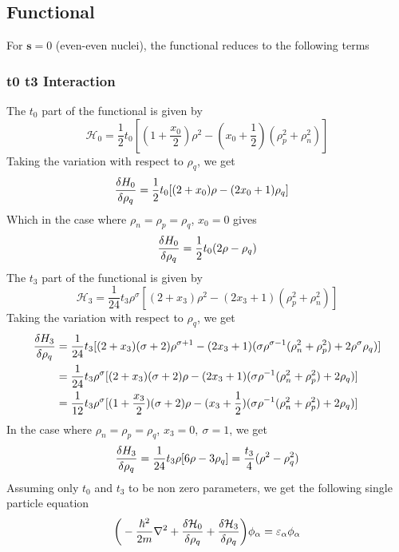 \subsection{Functional}
For $\boldsymbol{s} = 0$ (even-even nuclei), the functional reduces to the following terms
\subsubsection{t0 t3 Interaction}
The $t_0$ part of the functional is given by
\[\mathcal H_0 = \frac 1 2 t_0 [(1+\frac {x_0} 2)\rho^2 - (x_0 + \frac 1 2 )(\rho_p^2 + \rho_n^2)]\]
Taking the variation with respect to $\rho_q$, we get
\begin{align}
    \fdv{H_0}{\rho_q} &= \frac 1 2 t_0 [(2 + x_0)\rho - (2x_0 + 1)\rho_q]
\end{align}
Which in the case where $\rho_n = \rho_p = \rho_q$, $x_0 = 0$ gives
\[\fdv{H_0}{\rho_q} =\frac 1 2  t_0 (2 \rho - \rho_q ) \]
The $t_3$ part of the functional is given by
\[\mathcal H _3 = \frac 1 {24} t_3 \rho^\sigma [(2+x_3)\rho^2 -(2x_3+1)(\rho_p^2 + \rho_n^2)]\]
Taking the variation with respect to $\rho_q$, we get
\begin{align}
    \fdv{H_3}{\rho_q} &= \frac 1 {24} t_3  [(2+x_3)(\sigma + 2)\rho^{\sigma+1} - (2x_3+1)(\sigma \rho^{\sigma-1}(\rho_n^2+\rho_p^2) +2\rho^\sigma \rho_q)]
    \\&= \frac 1 {24} t_3 \rho^\sigma [(2+x_3)(\sigma + 2)\rho - (2x_3+1)(\sigma \rho^{-1}(\rho_n^2+\rho_p^2) +2\rho_q)]
    \\&= \frac 1 {12} t_3 \rho^\sigma [(1+\frac{x_3}{2})(\sigma + 2)\rho - (x_3+\frac 1 2 )(\sigma \rho^{-1}(\rho_n^2+\rho_p^2) +2\rho_q)]
\end{align}
In the case where $\rho_n = \rho_p = \rho_q$, $x_3 = 0,\ \sigma = 1$, we get
\[\fdv{H_3}{\rho_q} = \frac 1 {24} t_3 \rho [6\rho - 3\rho_q] = \frac{t_3}{4}(\rho^2 - \rho_q^2)\] 
Assuming only $t_0$ and $t_3$ to be non zero parameters, we get the following single particle equation
\begin{equation}
    \bigg(-\frac{\hbar^2}{2m} \nabla^2 + \fdv{\mathcal H_0}{\rho_q} + \fdv{\mathcal H_3}{\rho_q}\bigg)\phi_\alpha = \varepsilon_\alpha\phi_\alpha
\end{equation}

